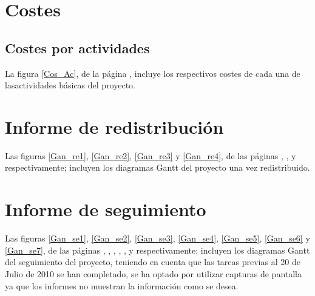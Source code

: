 \documentclass[11pt,a4paper,spanish,twoside]{book}
\begin{document}
\section{Costes}

\subsection{Costes por actividades}
La figura \ref{Cos_Ac}, de la página \pageref{Cos_Ac}, incluye los
respectivos costes de cada una de lasactividades básicas del proyecto. 

\begin{sidewaystable}
\end{sidewaystable}

\section{Informe de redistribución}
Las figuras \ref{Gan_re1}, \ref{Gan_re2}, \ref{Gan_re3} y \ref{Gan_re4}, de
las páginas \pageref{Gan_re1}, \pageref{Gan_re2}, \pageref{Gan_re3} y
\pageref{Gan_re4} respectivamente; incluyen los diagramas Gantt del proyecto
una vez redistribuido.

\begin{sidewaystable}
\end{sidewaystable}

\begin{sidewaystable}
\end{sidewaystable}

\begin{sidewaystable}
\end{sidewaystable}

\begin{sidewaystable}
\end{sidewaystable}

\section{Informe de seguimiento}
Las figuras \ref{Gan_se1}, \ref{Gan_se2}, \ref{Gan_se3}, \ref{Gan_se4},
\ref{Gan_se5}, \ref{Gan_se6} y \ref{Gan_se7}, de las páginas
\pageref{Gan_se1}, \pageref{Gan_se2}, \pageref{Gan_se3}, \pageref{Gan_se4},
\pageref{Gan_se5}, \pageref{Gan_se6} y \pageref{Gan_se7} respectivamente;
incluyen los diagramas Gantt del seguimiento del proyecto, teniendo en cuenta
que las tareas previas al 20 de Julio de 2010 se han completado, se ha optado
por utilizar capturas de pantalla ya que los informes no muestran la
información como se desea.
\end{document}
